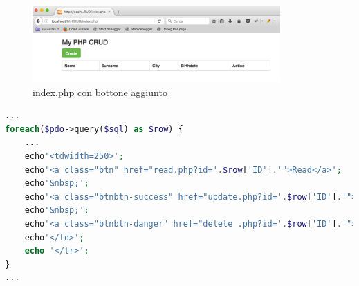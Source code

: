 \begin{center}
\begin{figure}[H]
\centering
\includegraphics[scale=1]{figures/indexphp3.png}
\caption{index.php con bottone aggiunto} 
\end{figure}
\end{center}

\begin{lstlisting}[language=PHP]
...
foreach($pdo->query($sql) as $row) {
	...
	echo'<tdwidth=250>';
    echo'<a class="btn" href="read.php?id='.$row['ID'].'">Read</a>';
    echo'&nbsp;';
    echo'<a class="btnbtn-success" href="update.php?id='.$row['ID'].'">Update</a>';
    echo'&nbsp;';
    echo'<a class="btnbtn-danger" href="delete .php?id='.$row['ID'].'">Delete</a>';
    echo'</td>';
    echo '</tr>';
}
...
\end{lstlisting}

